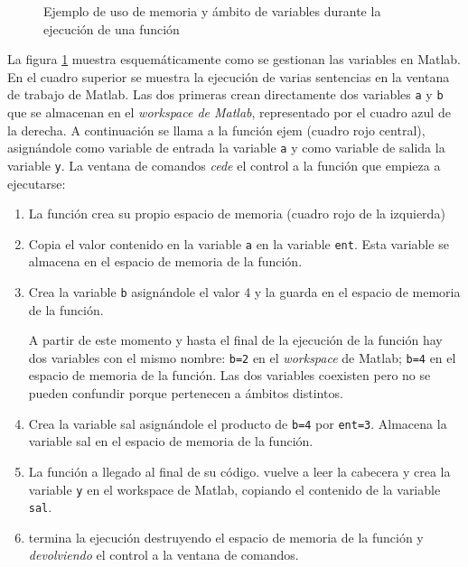 \begin{figure}[h]
\caption{Ejemplo de uso de memoria y ámbito de variables durante la ejecución de una función}
\label{fig:amb}
\end{figure} 

La figura \ref{fig:amb} muestra esquemáticamente como se gestionan las variables en Matlab. En el cuadro superior se muestra la ejecución de varias sentencias en la ventana de trabajo de Matlab. Las dos primeras crean directamente dos variables \texttt{a} y \texttt{b} que se almacenan en el \emph{workspace de Matlab}, representado por el cuadro azul de la derecha. 
A continuación se llama a la función ejem (cuadro rojo central), asignándole como variable de entrada la variable \texttt{a} y como variable de salida la variable \texttt{y}. La ventana de comandos \emph{cede} el control a la función que empieza a ejecutarse:
\begin{enumerate}
\item La función crea su propio espacio de memoria (cuadro rojo de la izquierda)
\item Copia el valor contenido en la variable \texttt{a} en la variable \texttt{ent}. Esta variable se almacena en el espacio de memoria de la función.
\item Crea la variable \texttt{b} asignándole el valor 4 y la guarda en el espacio de memoria de la función. 

A partir de este momento y hasta el final de la ejecución de la función hay dos variables con el mismo nombre: \texttt{b=2} en el \emph{workspace} de Matlab; \texttt{b=4} en el espacio de memoria de la función. Las dos variables coexisten pero no se pueden confundir porque pertenecen a ámbitos distintos.
\item Crea la variable sal asignándole el producto de \texttt{b=4} por \texttt{ent=3}. Almacena la variable sal en el espacio de memoria de la función.
\item La función a llegado al final de su código. vuelve a leer la cabecera y crea la variable \texttt{y} en el workspace de Matlab, copiando el contenido de la variable \texttt{sal}.
\item termina la ejecución destruyendo el espacio de memoria de la función y \emph{devolviendo} el control a la ventana de comandos.
\end{enumerate}

